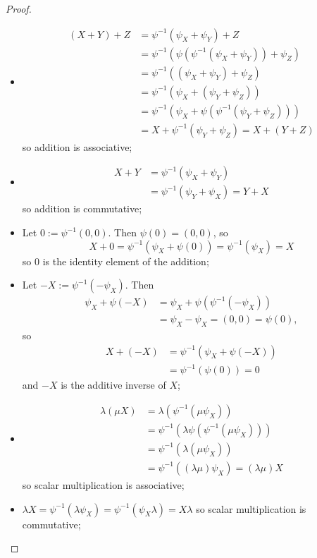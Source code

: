 \begin{proof}
	\begin{itemize}
		\item \begin{align*}
			(X+Y)+Z&=\psi^{-1}(\psi_X+\psi_Y)+Z\\
			&=\psi^{-1}(\psi(\psi^{-1}(\psi_X+\psi_Y))+\psi_Z)\\
			&=\psi^{-1}((\psi_X+\psi_Y)+\psi_Z)\\
			&=\psi^{-1}(\psi_X+(\psi_Y+\psi_Z))\\
			&=\psi^{-1}(\psi_X+\psi(\psi^{-1}(\psi_Y+\psi_Z)))\\
			&=X+\psi^{-1}(\psi_Y+\psi_Z)=X+(Y+Z)
		\end{align*} so addition is associative;
		
		\item \begin{align*}
			X+Y&=\psi^{-1}(\psi_X+\psi_Y)\\
			&=\psi^{-1}(\psi_Y+\psi_X)=Y+X
		\end{align*}so addition is commutative;
		
		\item Let $0:=\psi^{-1}(0,0)$. Then $\psi(0)=(0,0)$, so\[X+0=\psi^{-1}(\psi_X+\psi(0))=\psi^{-1}(\psi_X)=X\]so $0$ is the identity element of the addition;
		
		\item Let $-X:=\psi^{-1}(-\psi_X)$. Then \begin{align*}
			\psi_X+\psi(-X)&=\psi_X+\psi(\psi^{-1}(-\psi_X))\\
			&=\psi_X-\psi_X=(0,0)=\psi(0),
		\end{align*}so \begin{align*}
			X+(-X)&=\psi^{-1}(\psi_X+\psi(-X))\\&=\psi^{-1}(\psi(0))=0
		\end{align*}and $-X$ is the additive inverse of $X$;
		
		\item \begin{align*}
			\lambda(\mu X)&=\lambda(\psi^{-1}(\mu \psi_X))\\
			&=\psi^{-1}(\lambda \psi(\psi^{-1}(\mu \psi_X)))\\
			&=\psi^{-1}(\lambda (\mu \psi_X))\\
			&=\psi^{-1}((\lambda\mu)\psi_X)=(\lambda\mu) X
		\end{align*}so scalar multiplication is associative;
		
		\item $\lambda X=\psi^{-1}(\lambda \psi_X)=\psi^{-1}(\psi_X\lambda)=X\lambda$ so scalar multiplication is commutative;
		

\end{itemize}
\end{proof}

